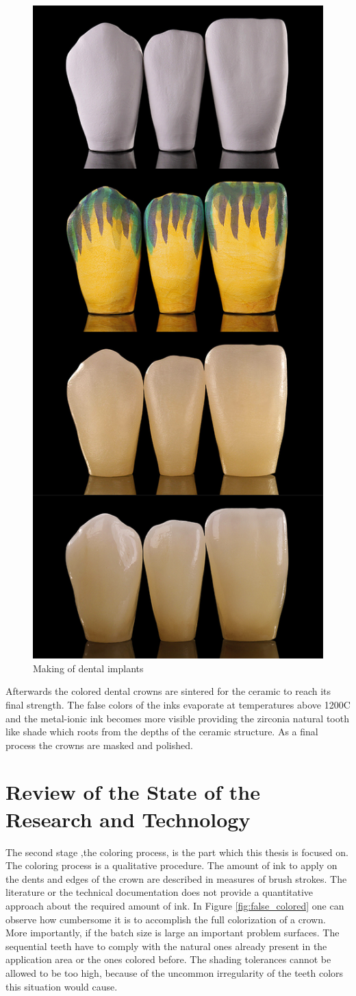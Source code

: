 \bigskip

\begin{figure}[H]
	\centering
	\includegraphics[height=0.6\textwidth]{grafiken/CrownProcesses.jpg}
	\caption{Making of dental implants \citep{zirkonzahn2018} }
	\label{fig:CrownProcesses}
\end{figure} 

 \bigskip

Afterwards the colored dental crowns are sintered for the ceramic to reach its final strength. The false colors of the inks evaporate at temperatures above 1200\textdegree C and the metal-ionic ink becomes more visible providing the zirconia natural tooth like shade which roots from the depths of the ceramic structure. As a final process the crowns are masked and polished.



\chapter{Review of the State of the Research and Technology}
\label{sec:kritik_stand_technik}
The second stage ,the coloring process, is the part which this thesis is focused on. The coloring process is a qualitative procedure. The amount of ink to apply on the dents and edges of the crown are described in measures of brush strokes. The literature or the technical documentation does not provide a quantitative approach about the required amount of ink. In Figure \ref{fig:false_colored} one can observe how cumbersome it is to accomplish the full colorization of a crown. More importantly, if the batch size is large an important problem surfaces. The sequential teeth have to comply with the natural ones already present in the application area or the ones colored before. The shading tolerances cannot be allowed to be too high, because of the uncommon irregularity of the teeth colors this situation would cause.

